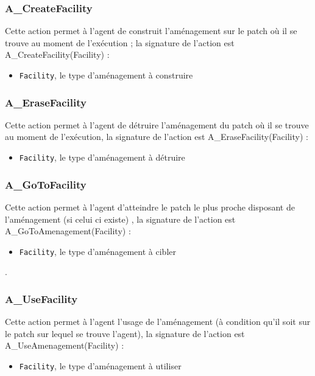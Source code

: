 \subsubsection{A\_CreateFacility} 
	Cette action permet à l'agent de construit l'aménagement sur le patch où il se trouve au moment de l'exécution ; la signature de l'action est A\_CreateFacility(Facility) :

	\begin{itemize}
	\item \texttt{Facility}, le type d'aménagement à construire
	\end{itemize}
	
	
\subsubsection{A\_EraseFacility} 
Cette action permet à l'agent de détruire l'aménagement du  patch où il se trouve au moment de l'exécution, la signature de l'action est A\_EraseFacility(Facility) :

	\begin{itemize}
	\item \texttt{Facility}, le type d'aménagement à détruire
	\end{itemize}
	

\subsubsection{A\_GoToFacility} 
Cette action permet à l'agent d'atteindre le patch le plus proche disposant de l'aménagement (si celui ci existe) , la signature de l'action est A\_GoToAmenagement(Facility) :
	\begin{itemize}
	\item \texttt{Facility}, le type d'aménagement à cibler
	\end{itemize}
	
	.
	
\subsubsection{A\_UseFacility} 
Cette action permet à l'agent l'usage de l'aménagement (à condition qu'il soit sur le patch sur lequel se trouve l'agent), la signature de l'action est A\_UseAmenagement(Facility) :
	\begin{itemize}
	\item \texttt{Facility}, le type d'aménagement à utiliser
	\end{itemize}
	
